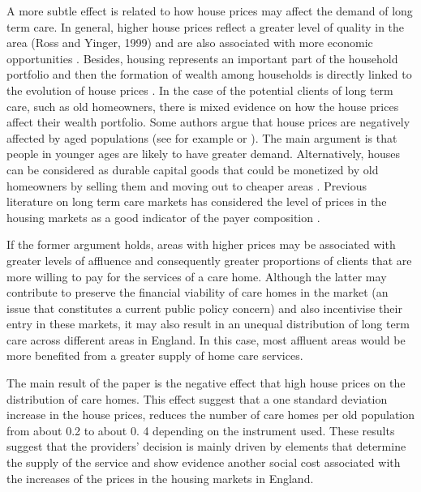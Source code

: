 \documentclass[12pt,letterpaper]{article}
\begin{document}
  A more subtle effect is related to how house prices may affect the demand 
  of long term care. In general, higher house prices reflect a greater level of
  quality in the area (Ross and Yinger, 1999) and are also associated with 
 more economic opportunities \citep{ratcliffe2015wealth}. Besides, housing 
 represents an important part of the household portfolio and then the formation 
of wealth among households is directly linked to the evolution of house prices \citep{rosenthal2004evidence}. In the case of the potential clients of long term care, such as old homeowners, there is mixed evidence on
how the house prices affect their wealth portfolio. Some authors argue that house prices are negatively affected by aged populations (see for example \citet{mankiw1989baby} or \citet{takats2010ageing}). The 
main argument is that people in younger ages are likely to have greater demand. 
Alternatively, houses can be considered as durable capital goods that could 
be monetized by old homeowners by selling them and moving out to cheaper areas \citep{hilber2016housingpolicies, hiller2016aging}. 
Previous literature on long term care markets has considered the level of prices 
in the housing markets as a good indicator of the payer composition 
\citet{darton2010slicing}.

If the former argument holds, areas with higher 
     prices may be associated with greater levels of affluence and consequently greater proportions of clients
      that are more willing to pay for the services of a care home. Although the latter may contribute to preserve 
      the financial viability of care homes in the market (an issue that constitutes a current public policy concern) 
      and also incentivise their entry in these markets, it may also result in an unequal distribution of long term care across different areas in England. 
       In this case, most affluent areas would be more benefited from a greater supply of home care services. 


The main result of the paper is the negative effect that high house prices on the distribution of care homes. 
 This effect suggest that a one standard deviation 
increase in the house prices, reduces the number of care homes per old population from about 0.2 to about 0. 4 depending on the instrument used.
These results suggest that the providers' decision is mainly driven by elements that determine 
the supply of the service and show evidence another social cost associated with the increases of the prices in the housing markets
in England.  
\end{document}
